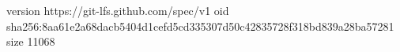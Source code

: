 version https://git-lfs.github.com/spec/v1
oid sha256:8aa61e2a68dacb5404d1cefd5cd335307d50c42835728f318bd839a28ba57281
size 11068

